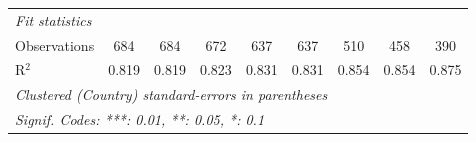 \begin{tabular}{lcccccccc}
   \midrule \emph{Fit statistics}\\
   Observations                                              & 684           & 684           & 672           & 637            & 637            & 510           & 458          & 390\\  
   R$^2$                                                     & 0.819         & 0.819         & 0.823         & 0.831          & 0.831          & 0.854         & 0.854        & 0.875\\  
   \midrule
   \multicolumn{9}{l}{\emph{Clustered (Country) standard-errors in parentheses}}\\
   \multicolumn{9}{l}{\emph{Signif. Codes: ***: 0.01, **: 0.05, *: 0.1}}\\
\end{tabular}
\par\endgroup


